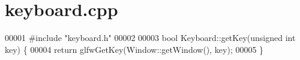 \section{keyboard.\+cpp}
\label{keyboard_8cpp_source}

\begin{DoxyCode}
00001 \textcolor{preprocessor}{#include "keyboard.h"}
00002 
00003 \textcolor{keywordtype}{bool} Keyboard::getKey(\textcolor{keywordtype}{unsigned} \textcolor{keywordtype}{int} key)  \{
00004     \textcolor{keywordflow}{return} glfwGetKey(Window::getWindow(), key);
00005 \}
\end{DoxyCode}
